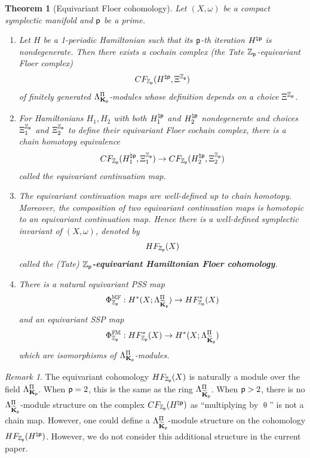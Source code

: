 \documentclass[reqno, 10pt]{amsart}
\numberwithin{equation}{section}
\numberwithin{equation}{section}
\newtheorem{thma}{Theorem}
\theoremstyle{definition}
\theoremstyle{remark}
\newtheorem{rem}[thm]{Remark}
\newcommand{\beqn}{\begin{equation*}}
\newcommand{\eeqn}{\end{equation*}}
\newcommand{\mb}{\mathbb}
\newcommand{\p}{{\sf p}}
\newcommand{\kp}{{\bf K}_{\sf p}}
\newcommand{\tkp}{\wt{\bf K}_{\sf p}}
\newcommand{\zp}{{{\mb Z}_{\sf p}}}
\newcommand{\wt}{\widetilde}
\begin{document}
\begin{thma}[Equivariant Floer cohomology]\label{thma_equivariant_Floer}
Let $(X,\omega)$ be a compact symplectic manifold and $\p$ be a prime.

\begin{enumerate}

\item Let $H$ be a 1-periodic Hamiltonian such that its $\p$-th iteration $H^{\natural\p}$ is nondegenerate. Then there exists a cochain complex (the Tate $\zp$-equivariant Floer complex)
    \beqn
    CF_{\zp} (H^{\natural \p}, \Xi^\zp)
    \eeqn
    of finitely generated $\Lambda_{\kp}^\Pi$-modules whose definition depends on a choice $\Xi^\zp$.

    \item For Hamiltonians $H_1, H_2$ with both $H_1^{\natural \p}$ and $H_2^{\natural \p}$ nondegenerate and choices $\Xi_1^\zp$ and $\Xi_2^\zp$ to define their equivariant Floer cochain complex, there is a chain homotopy equivalence
    \beqn
    CF_\zp (H_1^{\natural\p}, \Xi_1^\zp) \to CF_{\zp} (H_2^{\natural \p}, \Xi_2^\zp)
    \eeqn
    called the equivariant continuation map.

    \item The equivariant continuation maps are well-defined up to chain homotopy. Moreover, the composition of two equivariant continuation maps is homotopic to an equivariant continuation map.     Hence there is a well-defined symplectic invariant of $(X, \omega)$, denoted by 
    \beqn
    HF_\zp (X)
    \eeqn
    called the (Tate) {\bf $\zp$-equivariant Hamiltonian Floer cohomology}.



    \item There is a natural equivariant PSS map
    \beqn
    \Phi_{\zp}^{\mb{MF}}: H^*(X; \Lambda_{\tkp}^\Pi) \to HF_{\zp}^*(X)
    \eeqn
    and an equivariant SSP map
    \beqn
    \Phi_{\zp}^{\mb{FM}}: HF_{\zp}^*(X) \to H^*(X; \Lambda_{\tkp}^\Pi)
    \eeqn
    which are isomorphisms of $\Lambda_{\kp}^\Pi$-modules.
\end{enumerate}
\end{thma}

\begin{rem}
The equivariant cohomology $HF_{\zp}(X)$ is naturally a module over the field $\Lambda_{\kp}^\Pi$. When $\p=2$, this is the same as the ring $\Lambda_{\tkp}^\Pi$. When $\p>2$, there is no $\Lambda_{\tkp}^\Pi$-module structure on the complex $CF_{\zp}(H^{\natural \p})$ as ``multiplying by $\uptheta$'' is not a chain map. However, one could define a $\Lambda_{\tkp}^\Pi$-module structure on the cohomology $HF_{\zp}(H^{\natural \p})$. However, we do not consider this additional structure in the current paper. 
\end{rem}
 
\end{document}
